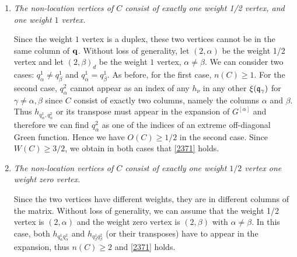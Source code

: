 \documentclass[draft]{article}
\newcommand{\bq}{{\bf {q}}}
\newcommand{\fq}{{\frak q}}
\newcommand{\sa}{{[\alpha ]}}
\newcommand{\al}{\alpha}
\numberwithin{equation}{section}
\numberwithin{theorem}{section}
\numberwithin{definition}{section}
\numberwithin{remark}{section}
\begin{document}
\begin{description}
\begin{enumerate}
 
Finally, consider the case   $ q^1_\alpha=  q^1_\beta$.  Since  
$ q^2_\alpha$ and $   q^2_\beta$ have 
weight $1/2$, they are not duplex. 
By construction, we have to expand the Green function $G^{(q^1_\al)}_{q^2_\al, q^3_\al}$.
 Since  $q^2_\al \not = q^3_\al$, 
in the expansion \eqref{expans}, the first Green function  $G^{\sa }_{\mu^\alpha_1}$
 is off-diagonal (otherwise the beginning of the
 expansion were $G^\sa_{q^2_\al, q^2_\al} h_{q^2_\al q^1_\al}\ldots$, but $h_{q^2_\al q^1_\al}$
cannot appear in the expansion of $G^{(q^1_\al)}_{q^2_\al, q^3_\al}$).
Hence  $q^2_\al$  appears  as an index of an extreme  off-diagonal Green function.  
Similar statement holds for $q^2_\beta$. Hence we have identified two indices of 
 off-diagonal Green functions  
associated with $C$  so that  $O(C) \ge 1 $  and  together with $W(C)\ge 1$
we obtain that \eqref{2371} holds. 

  
 
\item {\it The non-location vertices of $C$ consist  of exactly one weight 1/2  vertex,
and one weight $1$  vertex.}

Since the weight $1$ vertex is a duplex, these two vertices
cannot be in the same column of $\bq$. Without loss of generality, let $(2,\al)$ be the
weight 1/2 vertex and let $(2,\beta)_d$ be the
 weight $1$ vertex, $\al\ne\beta$.
We can consider two cases:  $ q^1_\alpha \not =   q^1_\beta$ and
 $ q^1_\alpha  =   q^1_\beta$. As before, for the first case, $n(C) \ge 1$. For the 
second case,  $q^2_\al$ cannot appear as an index of any  $h_\nu$
in any other $\xi(\fq_\gamma)$ for $\gamma\ne \al,\beta$ since $C$ consist of exactly
two columns, namely the columns $\alpha$ and $\beta$.
Thus $h_{q_\al^1,q_\al^2}$ or its transpose must appear in the expansion
of  $G^{[\al]}$ and therefore  we can find   $q^2_\al$ as one of the indices
of an extreme off-diagonal Green function. Hence
we have $O(C) \ge 1/2$ in the second case. Since $W(C)\ge 3/2$, we obtain in both cases that
 \eqref{2371} holds.



\item  {\it The non-location vertices of $C$ consist  of exactly one weight $1/2$ 
 vertex  one  weight zero vertex.}

Since the two vertices have different weights, they are in different
columns of the matrix. Without loss of generality, we can
assume that the weight 1/2 vertex is $(2,\al)$ and the weight zero vertex
is $(2,\beta)$ with $\al\ne \beta$.
 In this case, both $h_ {q^1_\alpha  q^2_\alpha}$ and $h_ {q^1_\beta  q^2_\beta}$
(or their transposes) 
 have to appear in the expansion, thus $n(C)\ge 2$  and \eqref{2371} holds. 



\end{enumerate}
\end{description}
\end{document}
